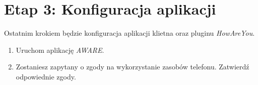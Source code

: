 
\section{Etap 3: Konfiguracja aplikacji}
\label{sec:pobranieIInstalacjaAplikacji}

Ostatnim krokiem będzie konfiguracja aplikacji klietna oraz pluginu \textit{HowAreYou}.

\begin{enumerate}
	
	\item Uruchom aplikację \textit{AWARE}.
	
	\item Zostaniesz zapytany o zgody na wykorzystanie zasobów telefonu. Zatwierdź odpowiednie zgody.
	

\end{enumerate}
